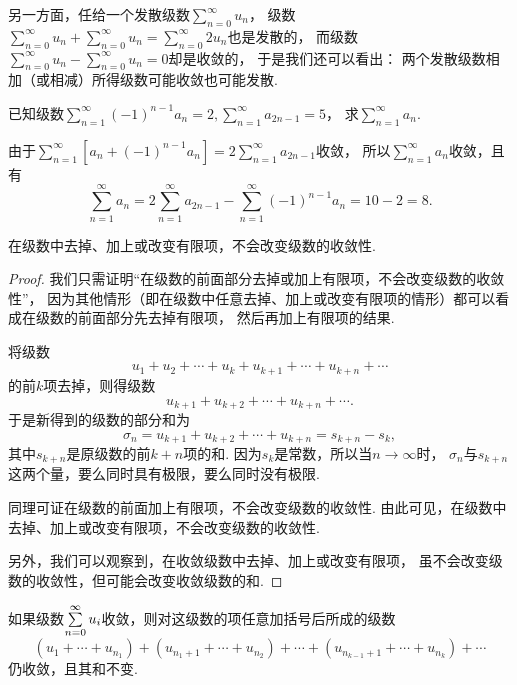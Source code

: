 {\def\s{\sum\limits_{n=0}^\infty }%
另一方面，任给一个发散级数\(\s u_n\)，
级数\(\s u_n + \s u_n
= \s 2 u_n\)也是发散的，
而级数\(\s u_n - \s u_n
= 0\)却是收敛的，
于是我们还可以看出：
\color{red}两个发散级数相加（或相减）所得级数可能收敛也可能发散.}

\begin{example}
已知级数\(\sum\limits_{n=1}^\infty (-1)^{n-1} a_n = 2,
\sum\limits_{n=1}^\infty a_{2n-1} = 5\)，
求\(\sum\limits_{n=1}^\infty a_n\).
\begin{solution}
由于\(\sum\limits_{n=1}^\infty [a_n + (-1)^{n-1} a_n]
= 2 \sum\limits_{n=1}^\infty a_{2n-1}\)收敛，
所以\(\sum\limits_{n=1}^\infty a_n\)收敛，且有
\[
\sum\limits_{n=1}^\infty a_n
= 2 \sum\limits_{n=1}^\infty a_{2n-1}
- \sum\limits_{n=1}^\infty (-1)^{n-1} a_n
= 10 - 2 = 8.
\]
\end{solution}
\end{example}

\begin{property}\label{theorem:无穷级数.收敛级数性质3}
在级数中去掉、加上或改变有限项，不会改变级数的收敛性.
\begin{proof}
我们只需证明“在级数的前面部分去掉或加上有限项，不会改变级数的收敛性”，
因为其他情形（即在级数中任意去掉、加上或改变有限项的情形）都可以看成在级数的前面部分先去掉有限项，
然后再加上有限项的结果.

将级数\[
u_1+u_2+\dotsb+u_k+u_{k+1}+\dotsb+u_{k+n}+\dotsb
\]的前\(k\)项去掉，则得级数\[
u_{k+1}+u_{k+2}+\dotsb+u_{k+n}+\dotsb.
\]于是新得到的级数的部分和为\[
\sigma_n = u_{k+1}+u_{k+2}+\dotsb+u_{k+n} = s_{k+n} - s_k,
\]其中\(s_{k+n}\)是原级数的前\(k+n\)项的和.
因为\(s_k\)是常数，所以当\(n\to\infty\)时，
\(\sigma_n\)与\(s_{k+n}\)这两个量，要么同时具有极限，要么同时没有极限.

同理可证在级数的前面加上有限项，不会改变级数的收敛性.
由此可见，在级数中去掉、加上或改变有限项，不会改变级数的收敛性.

另外，我们可以观察到，在收敛级数中去掉、加上或改变有限项，
虽不会改变级数的收敛性，但可能会改变收敛级数的和.
\end{proof}
\end{property}

\begin{property}\label{theorem:无穷级数.收敛级数性质4}
如果级数\(\s u_i\)收敛，则对这级数的项任意加括号后所成的级数\[
(u_1+\dotsb+u_{n_1}) + (u_{n_1+1}+\dotsb+u_{n_2}) + \dotsb + (u_{n_{k-1}+1}+\dotsb+u_{n_k}) + \dotsb
\]仍收敛，且其和不变.
\end{property}

